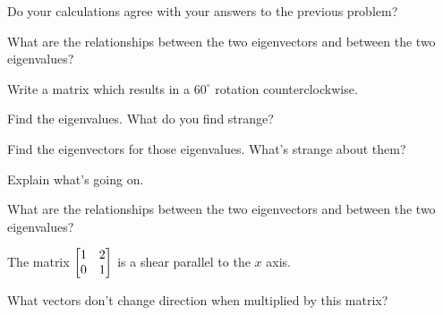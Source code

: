 \documentclass[../gatm_answers.tex]{subfiles}
\begin{document}
\begin{inner_problem}
\item Do your calculations agree with your answers to the previous problem?
\end{inner_problem}

\begin{inner_problem}
\item What are the relationships between the two eigenvectors and between the two eigenvalues?
\end{inner_problem}

\begin{outer_problem}
\item
\end{outer_problem}

\begin{inner_problem}[start=1]
\item Write a matrix which results in a $60^\circ$ rotation counterclockwise.
\end{inner_problem}

\begin{inner_problem}
\item Find the eigenvalues. What do you find strange?
\end{inner_problem}

\begin{inner_problem}
\item Find the eigenvectors for those eigenvalues. What's strange about them?
\end{inner_problem}

\begin{inner_problem}
\item Explain what's going on.
\end{inner_problem}

\begin{inner_problem}
\item What are the relationships between the two eigenvectors and between the two eigenvalues?
\end{inner_problem}

\begin{outer_problem}
\item The matrix $\begin{bmatrix} 1 & 2 \\ 0 & 1 \end{bmatrix}$ is a shear parallel to the $x$ axis.
\end{outer_problem}

\begin{inner_problem}[start=1]
\item What vectors don't change direction when multiplied by this matrix?
\end{inner_problem}
\end{document}
